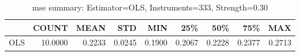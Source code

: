 \begin{table}[ht]
\centering
\caption{mse summary: Estimator=OLS, Instruments=333, Strength=0.30}
\begin{tabular}{lrrrrrrrr}
\toprule
 & COUNT & MEAN & STD & MIN & 25\% & 50\% & 75\% & MAX \\
\midrule
OLS & 10.0000 & 0.2233 & 0.0245 & 0.1900 & 0.2067 & 0.2228 & 0.2377 & 0.2713 \\
\bottomrule
\end{tabular}
\end{table}
